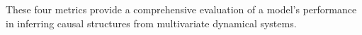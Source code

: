 These four metrics provide a comprehensive evaluation of a model's performance in inferring causal structures from multivariate dynamical systems.



 


